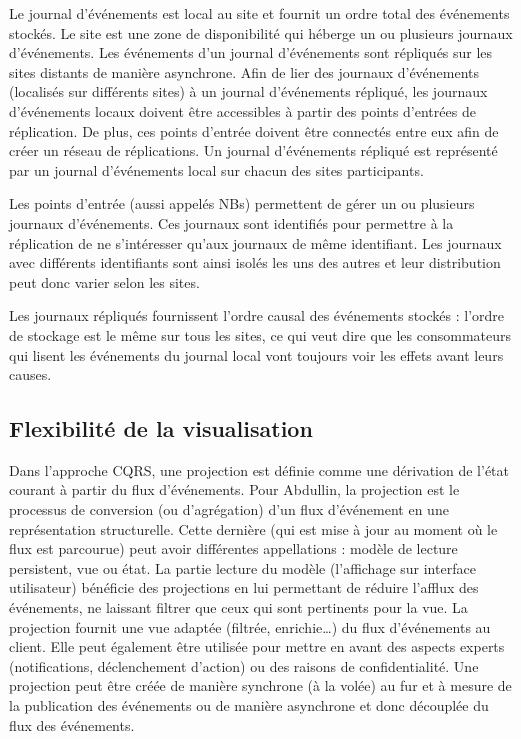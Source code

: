 Le journal d'événements est local au site et fournit un ordre total des 
événements stockés. 
Le site est une zone de disponibilité qui héberge un ou plusieurs 
journaux d'événements. Les événements d'un journal d'événements sont 
répliqués sur les sites distants de manière asynchrone. 
Afin de lier des journaux d'événements (localisés sur différents sites) à un journal 
d'événements répliqué, les 
journaux d'événements locaux doivent être accessibles à partir des points 
d'entrées de réplication. De plus, ces points d'entrée doivent être 
connectés entre eux afin de créer un réseau de réplications. 
Un journal d'événements répliqué est représenté par un journal d'événements local 
sur chacun des sites participants.

Les points d'entrée (aussi appelés \glspl{NB})
permettent de gérer un ou plusieurs journaux d'événements. 
Ces journaux sont identifiés pour permettre à la réplication de ne s'intéresser 
qu'aux journaux de même identifiant. 
Les journaux avec différents identifiants sont ainsi isolés les uns des autres et 
leur distribution peut donc varier selon les sites.

Les journaux répliqués fournissent l'ordre causal des événements stockés : l'ordre 
de stockage est le même sur tous les sites, ce qui veut dire que les 
consommateurs qui lisent les événements du journal local vont toujours voir les 
effets avant leurs causes.

\subsection{Flexibilité de la visualisation}
\label{sec:flexviz}
Dans l'approche \gls{CQRS}, une projection est définie comme une dérivation de 
l'état courant à 
partir du flux d'événements. Pour Abdullin, \og la projection est le processus de 
conversion (ou d'agrégation) d'un flux d'événement en une représentation 
structurelle. Cette dernière (qui est mise à jour au moment où le flux est 
parcourue) 
peut avoir différentes appellations : modèle de lecture persistent, vue ou 
état\fg{}\cite{Abdullin2011}.
La partie lecture du modèle (l'affichage sur interface utilisateur) bénéficie des 
projections en lui permettant de réduire l'afflux des événements, ne laissant filtrer 
que ceux qui sont pertinents pour la vue. La projection fournit une vue adaptée 
(filtrée, enrichie\ldots) du flux d'événements au client. Elle peut également être 
utilisée pour mettre en avant des aspects experts (notifications, déclenchement 
d'action) ou des raisons de confidentialité.
Une projection peut être créée de manière synchrone (à la volée) au fur et à 
mesure de la publication des événements ou de manière asynchrone et donc 
découplée du flux des événements. 


